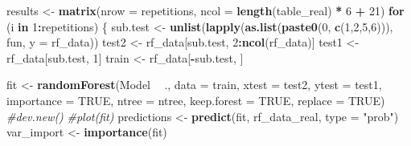 \documentclass[]{book}
\newenvironment{Shaded}{\begin{snugshade}}{\end{snugshade}}
\newcommand{\KeywordTok}[1]{\textcolor[rgb]{0.13,0.29,0.53}{\textbf{{#1}}}}
\newcommand{\DataTypeTok}[1]{\textcolor[rgb]{0.13,0.29,0.53}{{#1}}}
\newcommand{\DecValTok}[1]{\textcolor[rgb]{0.00,0.00,0.81}{{#1}}}
\newcommand{\StringTok}[1]{\textcolor[rgb]{0.31,0.60,0.02}{{#1}}}
\newcommand{\CommentTok}[1]{\textcolor[rgb]{0.56,0.35,0.01}{\textit{{#1}}}}
\newcommand{\OtherTok}[1]{\textcolor[rgb]{0.56,0.35,0.01}{{#1}}}
\newcommand{\ControlFlowTok}[1]{\textcolor[rgb]{0.13,0.29,0.53}{\textbf{{#1}}}}
\newcommand{\OperatorTok}[1]{\textcolor[rgb]{0.81,0.36,0.00}{\textbf{{#1}}}}
\newcommand{\NormalTok}[1]{{#1}}
\theoremstyle{definition}
\theoremstyle{definition}
\theoremstyle{definition}
\theoremstyle{remark}
\begin{document}
\begin{Shaded}
\begin{Highlighting}[]
\NormalTok{ results <-}\StringTok{ }\KeywordTok{matrix}\NormalTok{(}\DataTypeTok{nrow =}\NormalTok{ repetitions, }\DataTypeTok{ncol =} \KeywordTok{length}\NormalTok{(table_real) }\OperatorTok{*}\StringTok{ }\DecValTok{6} \OperatorTok{+}\StringTok{ }\DecValTok{21}\NormalTok{)}
 \ControlFlowTok{for}\NormalTok{ (i }\ControlFlowTok{in} \DecValTok{1}\OperatorTok{:}\NormalTok{repetitions) \{}
\NormalTok{   sub.test <-}\StringTok{ }\KeywordTok{unlist}\NormalTok{(}\KeywordTok{lapply}\NormalTok{(}\KeywordTok{as.list}\NormalTok{(}\KeywordTok{paste0}\NormalTok{(}\DecValTok{0}\NormalTok{, }\KeywordTok{c}\NormalTok{(}\DecValTok{1}\NormalTok{,}\DecValTok{2}\NormalTok{,}\DecValTok{5}\NormalTok{,}\DecValTok{6}\NormalTok{))), fun,}
                             \DataTypeTok{y =}\NormalTok{ rf_data))}
\NormalTok{   test2 <-}\StringTok{ }\NormalTok{rf_data[sub.test, }\DecValTok{2}\OperatorTok{:}\KeywordTok{ncol}\NormalTok{(rf_data)]}
\NormalTok{   test1 <-}\StringTok{ }\NormalTok{rf_data[sub.test, }\DecValTok{1}\NormalTok{]}
\NormalTok{   train <-}\StringTok{ }\NormalTok{rf_data[}\OperatorTok{-}\NormalTok{sub.test, ]}

\NormalTok{   fit <-}\StringTok{ }\KeywordTok{randomForest}\NormalTok{(Model }\OperatorTok{~}\StringTok{ }\NormalTok{., }\DataTypeTok{data =}\NormalTok{ train, }\DataTypeTok{xtest =}\NormalTok{ test2, }
                       \DataTypeTok{ytest =}\NormalTok{ test1, }\DataTypeTok{importance =} \OtherTok{TRUE}\NormalTok{, }
                       \DataTypeTok{ntree =}\NormalTok{ ntree, }\DataTypeTok{keep.forest =} \OtherTok{TRUE}\NormalTok{,}
                       \DataTypeTok{replace =} \OtherTok{TRUE}\NormalTok{)}
  \CommentTok{#dev.new()}
  \CommentTok{#plot(fit)}
\NormalTok{   predictions <-}\StringTok{ }\KeywordTok{predict}\NormalTok{(fit, rf_data_real, }\DataTypeTok{type =} \StringTok{"prob"}\NormalTok{)}
\NormalTok{   var_import <-}\StringTok{ }\KeywordTok{importance}\NormalTok{(fit)}


\end{Highlighting}
\end{Shaded}
\end{document}
